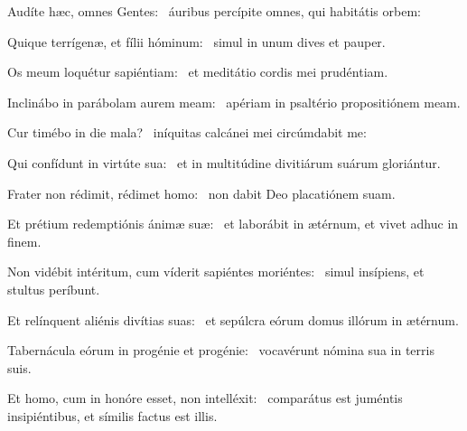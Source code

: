\item Audíte hæc, omnes Gentes:~\psstar{} áuribus percípite omnes, qui habitátis orbem:

\item Quique terrígenæ, et fílii hóminum:~\psstar{} simul in unum dives et pauper.

\item Os meum loquétur sapiéntiam:~\psstar{} et meditátio cordis mei prudéntiam.

\item Inclinábo in parábolam aurem meam:~\psstar{} apériam in psaltério propositiónem meam.

\item Cur timébo in die mala?~\psstar{} iníquitas calcánei mei circúmdabit me:

\item Qui confídunt in virtúte sua:~\psstar{} et in multitúdine divitiárum suárum gloriántur.

\item Frater non rédimit, rédimet homo:~\psstar{} non dabit Deo placatiónem suam.

\item Et prétium redemptiónis ánimæ suæ:~\psstar{} et laborábit in ætérnum, et vivet adhuc in finem.

\item Non vidébit intéritum, cum víderit sapiéntes moriéntes:~\psstar{} simul insípiens, et stultus períbunt.

\item Et relínquent aliénis divítias suas:~\psstar{} et sepúlcra eórum domus illórum in ætérnum.

\item Tabernácula eórum in progénie et progénie:~\psstar{} vocavérunt nómina sua in terris suis.

\item Et homo, cum in honóre esset, non intelléxit:~\psstar{} comparátus est juméntis insipiéntibus, et símilis factus est illis.

